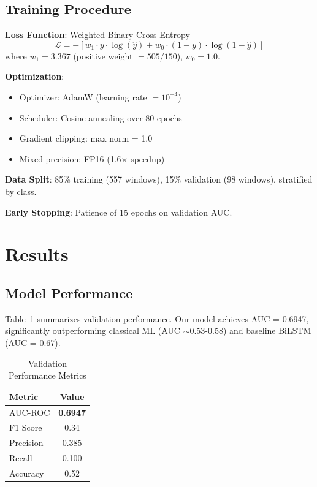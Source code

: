 \documentclass[twocolumn]{article}
\begin{document}
\subsection{Training Procedure}

\textbf{Loss Function}: Weighted Binary Cross-Entropy
\begin{equation}
\mathcal{L} = -\left[w_1 \cdot y \cdot \log(\hat{y}) + w_0 \cdot (1-y) \cdot \log(1-\hat{y})\right]
\end{equation}
where $w_1 = 3.367$ (positive weight $= 505/150$), $w_0 = 1.0$.

\textbf{Optimization}:
\begin{itemize}
\item Optimizer: AdamW (learning rate $= 10^{-4}$)
\item Scheduler: Cosine annealing over 80 epochs
\item Gradient clipping: max norm = 1.0
\item Mixed precision: FP16 (1.6$\times$ speedup)
\end{itemize}

\textbf{Data Split}: 85\% training (557 windows), 15\% validation (98 windows), stratified by class.

\textbf{Early Stopping}: Patience of 15 epochs on validation AUC.

\section{Results}

\subsection{Model Performance}

Table~\ref{tab:performance} summarizes validation performance. Our model achieves AUC = 0.6947, significantly outperforming classical ML (AUC $\sim$0.53-0.58) and baseline BiLSTM (AUC = 0.67).

\begin{table}[h]
\centering
\caption{Validation Performance Metrics}
\label{tab:performance}
\begin{tabular}{@{}lc@{}}
\toprule
\textbf{Metric} & \textbf{Value} \\
\midrule
AUC-ROC & \textbf{0.6947} \\
F1 Score & 0.34 \\
Precision & 0.385 \\
Recall & 0.100 \\
Accuracy & 0.52 \\
\bottomrule
\end{tabular}
\end{table}
\end{document}
